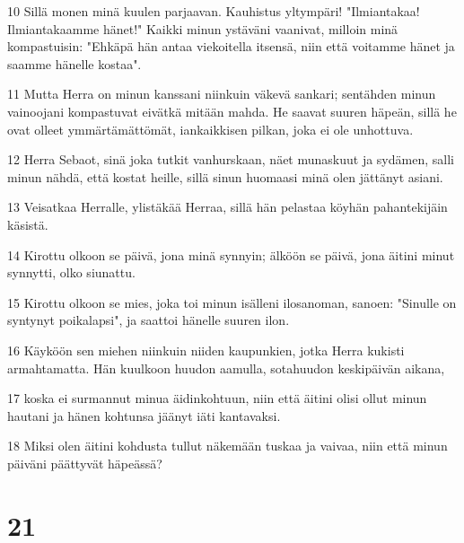 \par 10 Sillä monen minä kuulen parjaavan. Kauhistus yltympäri! "Ilmiantakaa! Ilmiantakaamme hänet!" Kaikki minun ystäväni vaanivat, milloin minä kompastuisin: "Ehkäpä hän antaa viekoitella itsensä, niin että voitamme hänet ja saamme hänelle kostaa".
\par 11 Mutta Herra on minun kanssani niinkuin väkevä sankari; sentähden minun vainoojani kompastuvat eivätkä mitään mahda. He saavat suuren häpeän, sillä he ovat olleet ymmärtämättömät, iankaikkisen pilkan, joka ei ole unhottuva.
\par 12 Herra Sebaot, sinä joka tutkit vanhurskaan, näet munaskuut ja sydämen, salli minun nähdä, että kostat heille, sillä sinun huomaasi minä olen jättänyt asiani.
\par 13 Veisatkaa Herralle, ylistäkää Herraa, sillä hän pelastaa köyhän pahantekijäin käsistä.
\par 14 Kirottu olkoon se päivä, jona minä synnyin; älköön se päivä, jona äitini minut synnytti, olko siunattu.
\par 15 Kirottu olkoon se mies, joka toi minun isälleni ilosanoman, sanoen: "Sinulle on syntynyt poikalapsi", ja saattoi hänelle suuren ilon.
\par 16 Käyköön sen miehen niinkuin niiden kaupunkien, jotka Herra kukisti armahtamatta. Hän kuulkoon huudon aamulla, sotahuudon keskipäivän aikana,
\par 17 koska ei surmannut minua äidinkohtuun, niin että äitini olisi ollut minun hautani ja hänen kohtunsa jäänyt iäti kantavaksi.
\par 18 Miksi olen äitini kohdusta tullut näkemään tuskaa ja vaivaa, niin että minun päiväni päättyvät häpeässä?

\chapter{21}

